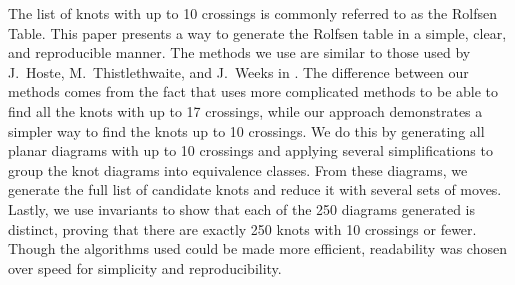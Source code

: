 
\code
\diagrams
\theorems

\begin{paperabs}
The list of knots with up to 10 crossings is commonly referred to as the Rolfsen
Table.
This paper presents a way to generate the Rolfsen table in a simple, clear, and
reproducible manner.
The methods we use are similar to those used by J.~Hoste, M.~Thistlethwaite, and
J.~Weeks in \cite{htw}.
The difference between our methods comes from the fact that \cite{htw} uses more
complicated methods to be able to find all the knots with up to 17 crossings,
while our approach demonstrates a simpler way to find the knots up to 10
crossings.
We do this by generating all planar diagrams with up to 10 crossings and
applying several simplifications to group the knot diagrams into equivalence
classes.
From these diagrams, we generate the full list of candidate knots and reduce it
with several sets of moves.
Lastly, we use invariants to show that each of the 250 diagrams generated is
distinct,  proving that there are exactly 250 knots with 10 crossings or fewer.
Though the algorithms used could be made more efficient, readability was chosen
over speed for simplicity and reproducibility.
\end{paperabs}
